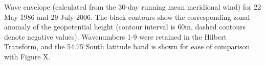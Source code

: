 \label{fig:example_envelope}
Wave envelope (calculated from the 30-day running mean meridional wind) for 22 May 1986 and 29 July 2006. The black contours show the corresponding zonal anomaly of the geopotential height (contour interval is 60m, dashed contours denote negative values). Wavenumbers 1-9 were retained in the Hilbert Transform, and the 54.75$^{\circ}$South latitude band is shown for ease of comparison with Figure X. 